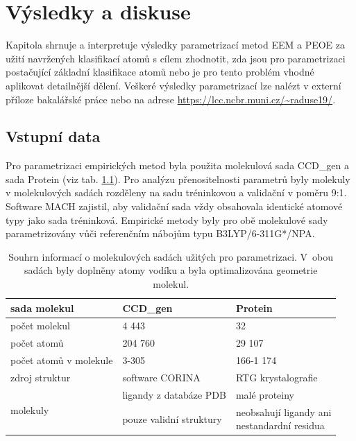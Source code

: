 \chapter{Výsledky a diskuse}
Kapitola shrnuje a interpretuje výsledky parametrizací metod EEM a PEOE za užití navržených klasifikací atomů s cílem zhodnotit, zda jsou pro parametrizaci postačující základní klasifikace atomů nebo je pro tento problém vhodné aplikovat detailnější dělení. Veškeré výsledky parametrizací lze nalézt v externí příloze bakalářské práce nebo na adrese \url{https://lcc.ncbr.muni.cz/~raduse19/}.  

\section{Vstupní data}
Pro parametrizaci empirických metod byla použita molekulová sada CCD\_gen a sada Protein (viz tab. \ref{moleculesets}). Pro analýzu přenositelnosti parametrů byly molekuly v molekulových sadách rozděleny na sadu tréninkovou a validační v poměru 9:1. Software MACH zajistil, aby validační sada vždy obsahovala identické atomové typy jako sada tréninková. Empirické metody byly pro obě molekulové sady parametrizovány vůči referenčním nábojům typu B3LYP/6-311G*/NPA.
\begin{table}[h]
    \renewcommand{\arraystretch}{1.35}
    \centering
    \begin{tabular}{l|l|l}
         sada molekul &  \textbf{CCD\_gen} \cite{krab1k}
         & \textbf{Protein}\\
         \hline
         počet molekul & 4 443 & 32\\
         počet atomů & 204 760 & 29 107\\
         počet atomů v molekule & 3-305 & 166-1 174 \\
         zdroj struktur & software CORINA & RTG krystalografie \\
         \hline
         \multirow{2}{8em}{molekuly} & 
            ligandy z databáze PDB & malé proteiny\\
         & pouze validní struktury & \makecell[l]{neobsahují ligandy ani \\nestandardní residua}
    \end{tabular}
    \caption{Souhrn informací o molekulových sadách užitých pro parametrizaci. V~obou sadách byly doplněny atomy vodíku a  byla optimalizována geometrie molekul.}
    \label{moleculesets}
\end{table}

